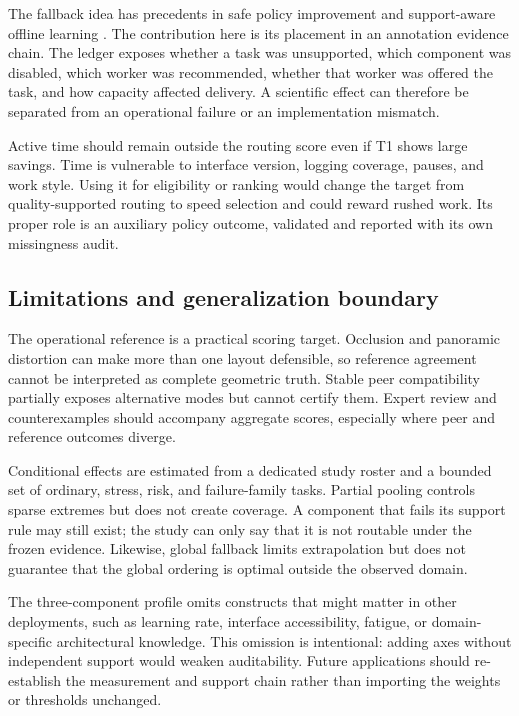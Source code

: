 The fallback idea has precedents in safe policy improvement and support-aware offline learning \cite{laroche2019spibb,sachdeva2020support}. The contribution here is its placement in an annotation evidence chain. The ledger exposes whether a task was unsupported, which component was disabled, which worker was recommended, whether that worker was offered the task, and how capacity affected delivery. A scientific effect can therefore be separated from an operational failure or an implementation mismatch.

Active time should remain outside the routing score even if T1 shows large savings. Time is vulnerable to interface version, logging coverage, pauses, and work style. Using it for eligibility or ranking would change the target from quality-supported routing to speed selection and could reward rushed work. Its proper role is an auxiliary policy outcome, validated and reported with its own missingness audit.

\subsection{Limitations and generalization boundary}

The operational reference is a practical scoring target. Occlusion and panoramic distortion can make more than one layout defensible, so reference agreement cannot be interpreted as complete geometric truth. Stable peer compatibility partially exposes alternative modes but cannot certify them. Expert review and counterexamples should accompany aggregate scores, especially where peer and reference outcomes diverge.

Conditional effects are estimated from a dedicated study roster and a bounded set of ordinary, stress, risk, and failure-family tasks. Partial pooling controls sparse extremes but does not create coverage. A component that fails its support rule may still exist; the study can only say that it is not routable under the frozen evidence. Likewise, global fallback limits extrapolation but does not guarantee that the global ordering is optimal outside the observed domain.

The three-component profile omits constructs that might matter in other deployments, such as learning rate, interface accessibility, fatigue, or domain-specific architectural knowledge. This omission is intentional: adding axes without independent support would weaken auditability. Future applications should re-establish the measurement and support chain rather than importing the weights or thresholds unchanged.

